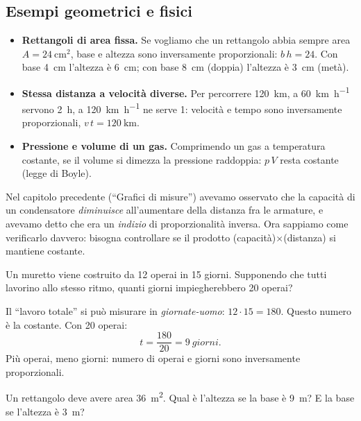 \subsection{Esempi geometrici e fisici}
\begin{itemize}
    \item \textbf{Rettangoli di area fissa.} Se vogliamo che un rettangolo abbia sempre area $A = \SI{24}{\centi\metre\squared}$, base e altezza sono inversamente proporzionali: $b\,h = 24$. Con base \SI{4}{\centi\metre} l'altezza è \SI{6}{\centi\metre}; con base \SI{8}{\centi\metre} (doppia) l'altezza è \SI{3}{\centi\metre} (metà).
    \item \textbf{Stessa distanza a velocità diverse.} Per percorrere \SI{120}{\kilo\metre}, a \SI{60}{\kilo\metre\per\hour} servono \SI{2}{\hour}, a \SI{120}{\kilo\metre\per\hour} ne serve \SI{1}{}: velocità e tempo sono inversamente proporzionali, $v\,t = \SI{120}{\kilo\metre}$.
    \item \textbf{Pressione e volume di un gas.} Comprimendo un gas a temperatura costante, se il volume si dimezza la pressione raddoppia: $p\,V$ resta costante (legge di Boyle).
\end{itemize}

\begin{remark}
Nel capitolo precedente (``Grafici di misure'') avevamo osservato che la capacità di un condensatore \emph{diminuisce} all'aumentare della distanza fra le armature, e avevamo detto che era un \emph{indizio} di proporzionalità inversa. Ora sappiamo come verificarlo davvero: bisogna controllare se il prodotto (capacità)$\times$(distanza) si mantiene costante.
\end{remark}

\begin{testexample}
Un muretto viene costruito da \SI{12}{} operai in \SI{15}{} giorni. Supponendo che tutti lavorino allo stesso ritmo, quanti giorni impiegherebbero \SI{20}{} operai?

Il ``lavoro totale'' si può misurare in \emph{giornate-uomo}: $12 \cdot 15 = 180$. Questo numero è la costante. Con \SI{20}{} operai:
\[ t = \frac{180}{20} = \SI{9}{giorni}. \]
Più operai, meno giorni: numero di operai e giorni sono inversamente proporzionali.
\end{testexample}

\begin{esercizio}
Un rettangolo deve avere area \SI{36}{\metre\squared}. Qual è l'altezza se la base è \SI{9}{\metre}? E la base se l'altezza è \SI{3}{\metre}?\\
\end{esercizio}


